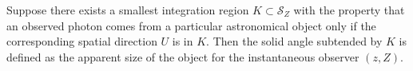 Suppose there exists a smallest integration region $K \subset \mathcal{S}_Z$ with the property that an observed photon comes from a particular astronomical object only if the corresponding spatial direction $U$ is in $K$. Then the solid angle subtended by $K$ is defined as the apparent size of the object for the instantaneous observer $(z, Z)$.
